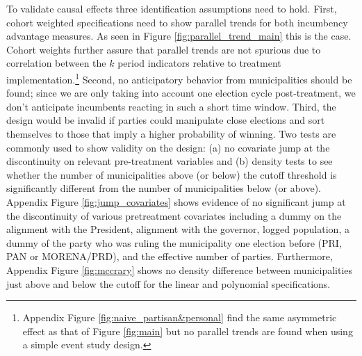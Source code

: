 \documentclass[12pt]{amsart}
\numberwithin{equation}{section}
\theoremstyle{definition}
\theoremstyle{definition}
\theoremstyle{definition}
\begin{document}
To validate causal effects three identification assumptions need to hold. First, cohort weighted specifications need to show parallel trends for both incumbency advantage measures. As seen in Figure \ref{fig:parallel_trend_main}  this is the case. Cohort weights further assure that parallel trends are not spurious due to correlation between the $k$ period indicators relative to treatment implementation.\footnote{Appendix Figure \ref{fig:naive_partisan&personal} find the same asymmetric effect as that of Figure \ref{fig:main} but no parallel trends are found when using a simple event study design.} Second, no anticipatory behavior from municipalities should be found; since we are only taking into account one election cycle post-treatment, we don't anticipate incumbents reacting in such a short time window. %
Third, the design would be invalid if parties could manipulate close elections and sort themselves to those that imply a higher probability of winning. Two tests are commonly used to show validity on the design: (a) no covariate jump at the discontinuity on relevant pre-treatment variables and (b) density tests to see whether the number of municipalities above (or below) the cutoff threshold is significantly different from the number of municipalities below (or above). Appendix Figure \ref{fig:jump_covariates} shows evidence of no significant jump at the discontinuity of various pretreatment covariates including a dummy on the alignment with the President, alignment with the governor, logged population, a dummy of the party who was ruling the municipality one election before (PRI, PAN or MORENA/PRD), and the effective number of parties. Furthermore, Appendix Figure \ref{fig:mccrary} shows no density difference between municipalities just above and below the cutoff for the linear and polynomial specifications. 
\end{document}
